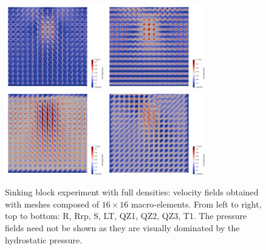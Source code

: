 \documentclass[a4paper,12pt]{article}
\begin{document}
\begin{figure}[t]
\includegraphics[width=4.3cm]{../results/exp08/fig16x16_full/vel3.jpg} %
\includegraphics[width=4.3cm]{../results/exp08/fig16x16_full/vel4.jpg} %
\includegraphics[width=4.3cm]{../results/exp08/fig16x16_full/vel5.jpg} %
\includegraphics[width=4.3cm]{../results/exp08/fig16x16_full/vel6.jpg} %
\caption{Sinking block experiment with full densities: velocity fields 
obtained with meshes composed of $16\times 16$ macro-elements.
From left to right, top to bottom: R, Rrp, S, LT, QZ1, QZ2, QZ3, T1.
The pressure fields need not be shown as they are visually dominated 
by the hydrostatic pressure.
\label{fig:block1}}
\end{figure}
\end{document}
